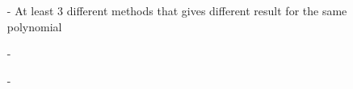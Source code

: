 \documentclass{beamer}
\begin{document}
\begin{projectsuccess}
    \begin{itemize}[leftmargin=*]
        \item[-] At least 3 different methods that gives different result for the same polynomial
        \item[-] 
        \item[-] 
    \end{itemize}
\end{projectsuccess}

\begin{projectreferences}
    \footnotesize
\end{projectreferences}
\end{document}
